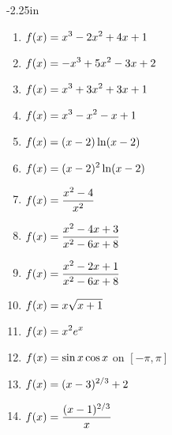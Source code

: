 \begin{adjustwidth*}{}{-2.25in}
\begin{multicols*}{2}

\begin{enumerate}[1),resume]
\item $\displaystyle f(x) = x^3-2x^2+4x+1$
\item $\displaystyle f(x) = -x^3+5x^2-3x+2$
\item $\displaystyle f(x) = x^3+3x^2+3x+1$
\item $\displaystyle f(x) = x^3-x^2-x+1$
\item $\displaystyle f(x) = (x-2)\ln (x-2)$
\item $\displaystyle f(x) = (x-2)^2\ln (x-2)$
\item $\displaystyle f(x) = \frac{x^2-4}{x^2}$
\item $\displaystyle f(x) = \frac{x^2-4x+3}{x^2-6x+8}$
\item $\displaystyle f(x) = \frac{x^2-2x+1}{x^2-6x+8}$
\item $\displaystyle f(x) = x\sqrt{x+1}$
\item $\displaystyle f(x) = x^2e^x$
\item $\displaystyle f(x) = \sin x \cos x$ on $[-\pi,\pi]$
\item $\displaystyle f(x) = (x-3)^{2/3} + 2$
\item $\displaystyle f(x) = \frac{(x-1)^{2/3}}{x}$
\end{enumerate}

\end{multicols*}
\end{adjustwidth*}

